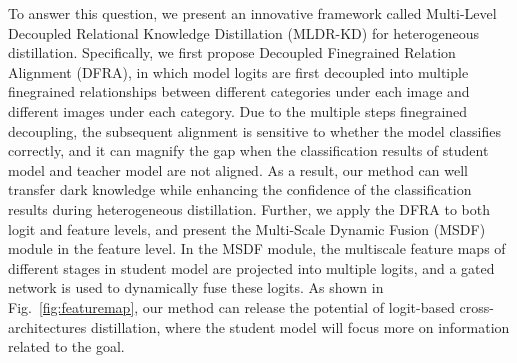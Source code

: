 To answer this question, we present an innovative framework called Multi-Level Decoupled Relational Knowledge Distillation (MLDR-KD) for heterogeneous distillation. Specifically, we first propose Decoupled Finegrained Relation Alignment (DFRA),
in which model logits are first decoupled into multiple finegrained relationships between different categories under each image and different images under each category. Due to the multiple steps finegrained decoupling, the subsequent alignment is sensitive to whether the model classifies correctly, and it can magnify the gap when the classification results of student model and teacher model are not aligned.
As a result, our method can well transfer dark knowledge while enhancing the confidence of the classification results during heterogeneous distillation. Further, we apply the DFRA to both logit and feature levels, and 
present the Multi-Scale Dynamic Fusion (MSDF) module in the feature level.
In the MSDF module, the multiscale feature maps of different stages in student model are projected into multiple logits, 
and a gated network is used to dynamically fuse these logits.
As shown in Fig.~\ref{fig:featuremap}, our method can release the potential of logit-based cross-architectures distillation, where the student model will focus more on information related to the goal. 




